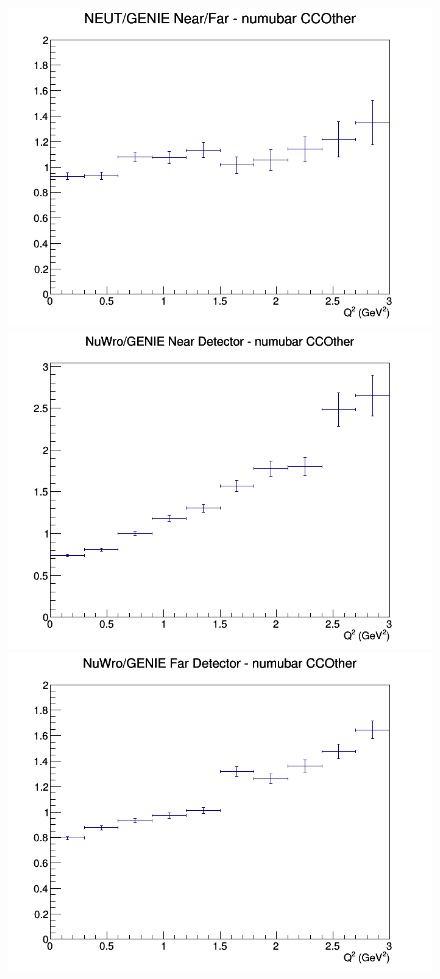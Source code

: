 \documentclass[12pt]{article}
\begin{document}
\begin{figure}[h]
\endminipage
{}
\includegraphics[width=\linewidth]{eff_Q2/LAr/ratios/CCOther_NEUT_GENIE_numubar_NF_Q2.png}
\endminipage
\newline
{}
\includegraphics[width=\linewidth]{eff_Q2/LAr/ratios/CCOther_NuWro_GENIE_numubar_near_Q2.png}
\endminipage
{}
\includegraphics[width=\linewidth]{eff_Q2/LAr/ratios/CCOther_NuWro_GENIE_numubar_far_Q2.png}

\end{figure}
\end{document}
